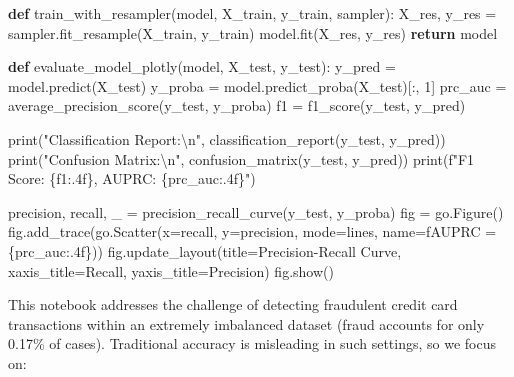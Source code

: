 \documentclass[
  letterpaper,
  DIV=11,
  numbers=noendperiod]{scrartcl}
\newenvironment{Shaded}{\begin{snugshade}}{\end{snugshade}}
\newcommand{\BuiltInTok}[1]{\textcolor[rgb]{0.00,0.23,0.31}{#1}}
\newcommand{\CharTok}[1]{\textcolor[rgb]{0.13,0.47,0.30}{#1}}
\newcommand{\ControlFlowTok}[1]{\textcolor[rgb]{0.00,0.23,0.31}{\textbf{#1}}}
\newcommand{\DecValTok}[1]{\textcolor[rgb]{0.68,0.00,0.00}{#1}}
\newcommand{\KeywordTok}[1]{\textcolor[rgb]{0.00,0.23,0.31}{\textbf{#1}}}
\newcommand{\NormalTok}[1]{\textcolor[rgb]{0.00,0.23,0.31}{#1}}
\newcommand{\OperatorTok}[1]{\textcolor[rgb]{0.37,0.37,0.37}{#1}}
\newcommand{\SpecialCharTok}[1]{\textcolor[rgb]{0.37,0.37,0.37}{#1}}
\newcommand{\SpecialStringTok}[1]{\textcolor[rgb]{0.13,0.47,0.30}{#1}}
\newcommand{\StringTok}[1]{\textcolor[rgb]{0.13,0.47,0.30}{#1}}
\begin{document}
\begin{Shaded}
\begin{Highlighting}[]
\KeywordTok{def}\NormalTok{ train\_with\_resampler(model, X\_train, y\_train, sampler):}
\NormalTok{    X\_res, y\_res }\OperatorTok{=}\NormalTok{ sampler.fit\_resample(X\_train, y\_train)}
\NormalTok{    model.fit(X\_res, y\_res)}
    \ControlFlowTok{return}\NormalTok{ model}

\KeywordTok{def}\NormalTok{ evaluate\_model\_plotly(model, X\_test, y\_test):}
\NormalTok{    y\_pred }\OperatorTok{=}\NormalTok{ model.predict(X\_test)}
\NormalTok{    y\_proba }\OperatorTok{=}\NormalTok{ model.predict\_proba(X\_test)[:, }\DecValTok{1}\NormalTok{]}
\NormalTok{    prc\_auc }\OperatorTok{=}\NormalTok{ average\_precision\_score(y\_test, y\_proba)}
\NormalTok{    f1 }\OperatorTok{=}\NormalTok{ f1\_score(y\_test, y\_pred)}

    \BuiltInTok{print}\NormalTok{(}\StringTok{"Classification Report:}\CharTok{\textbackslash{}n}\StringTok{"}\NormalTok{, classification\_report(y\_test, y\_pred))}
    \BuiltInTok{print}\NormalTok{(}\StringTok{"Confusion Matrix:}\CharTok{\textbackslash{}n}\StringTok{"}\NormalTok{, confusion\_matrix(y\_test, y\_pred))}
    \BuiltInTok{print}\NormalTok{(}\SpecialStringTok{f"F1 Score: }\SpecialCharTok{\{}\NormalTok{f1}\SpecialCharTok{:.4f\}}\SpecialStringTok{, AUPRC: }\SpecialCharTok{\{}\NormalTok{prc\_auc}\SpecialCharTok{:.4f\}}\SpecialStringTok{"}\NormalTok{)}

\NormalTok{    precision, recall, \_ }\OperatorTok{=}\NormalTok{ precision\_recall\_curve(y\_test, y\_proba)}
\NormalTok{    fig }\OperatorTok{=}\NormalTok{ go.Figure()}
\NormalTok{    fig.add\_trace(go.Scatter(x}\OperatorTok{=}\NormalTok{recall, y}\OperatorTok{=}\NormalTok{precision, mode}\OperatorTok{=}\StringTok{\textquotesingle{}lines\textquotesingle{}}\NormalTok{, name}\OperatorTok{=}\SpecialStringTok{f\textquotesingle{}AUPRC = }\SpecialCharTok{\{}\NormalTok{prc\_auc}\SpecialCharTok{:.4f\}}\SpecialStringTok{\textquotesingle{}}\NormalTok{))}
\NormalTok{    fig.update\_layout(title}\OperatorTok{=}\StringTok{\textquotesingle{}Precision{-}Recall Curve\textquotesingle{}}\NormalTok{, xaxis\_title}\OperatorTok{=}\StringTok{\textquotesingle{}Recall\textquotesingle{}}\NormalTok{, yaxis\_title}\OperatorTok{=}\StringTok{\textquotesingle{}Precision\textquotesingle{}}\NormalTok{)}
\NormalTok{    fig.show()}
\end{Highlighting}
\end{Shaded}

This notebook addresses the challenge of detecting fraudulent credit
card transactions within an extremely imbalanced dataset (fraud accounts
for only 0.17\% of cases). Traditional accuracy is misleading in such
settings, so we focus on:
\end{document}

